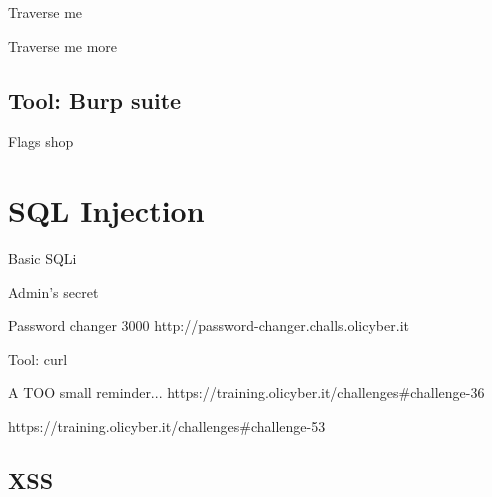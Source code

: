 \documentclass[12pt]{beamer}
\begin{document}
\begin{frame}{Traverse me}
\end{frame}

\begin{frame}{Traverse me more}
\end{frame}


\subsection{Tool: Burp suite}
\begin{frame}Flags shop{}
\end{frame}


\section{SQL Injection}
\begin{frame}{}
\end{frame}

\begin{frame}{Basic SQLi}
\end{frame}

\begin{frame}{Admin's secret}

\end{frame}


\begin{frame}{}
\end{frame}

\begin{frame}{Password changer 3000}
    http://password-changer.challs.olicyber.it
\end{frame}

\begin{frame}{Tool: curl}
\end{frame}
\begin{frame}{A TOO small reminder...}
    https://training.olicyber.it/challenges#challenge-36
\end{frame}

\begin{frame}
https://training.olicyber.it/challenges#challenge-53
\end{frame}

\subsection{XSS}
\end{document}
